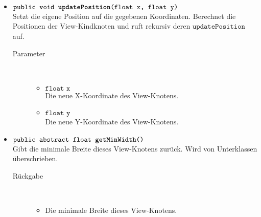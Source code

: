 \begin{description}
\begin{itemize}
		\item $\texttt{public void \textbf{updatePosition}(float x, float y)}$ \\ Setzt die eigene Position auf die gegebenen Koordinaten. Berechnet die Positionen der View-Kindknoten und ruft rekursiv deren $\texttt{updatePosition}$ auf. %
		\begin{description}
			\item[Parameter] \hfill \\
			\vspace{-.8cm}
			\begin{itemize}
				\item $\texttt{float x}$ \\ Die neue X-Koordinate des View-Knotens.
				\item $\texttt{float y}$ \\ Die neue Y-Koordinate des View-Knotens.
			\end{itemize}
		\end{description}
		
		\item $\texttt{public abstract float \textbf{getMinWidth}()}$ \\ Gibt die minimale Breite dieses View-Knotens zurück. Wird von Unterklassen überschrieben.
		\begin{description}
			\item[Rückgabe] \hfill \\
			\vspace{-.8cm}
			\begin{itemize}
				\item Die minimale Breite dieses View-Knotens.
			\end{itemize}
		\end{description}
		

\end{itemize}
\end{description}
